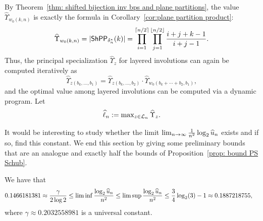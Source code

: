 \documentclass[10pt]{article}
\begin{document}
\begin{remark}
    By Theorem~\ref{thm: shifted bijection inv bps and plane partitions}, the value $\widehat{\Upsilon}_{w_0(k,n)}$ is exactly the formula in  Corollary~\ref{cor:plane partition product}:
\[
\widehat{\Upsilon}_{w_0(k,n)} = |\mathsf{ShPP}_{\delta^*_n}(k)| = \displaystyle\prod_{i=1}^{\lceil n/2\rceil} \prod_{j=1}^{\lfloor n/2\rfloor} \frac{i+j+k-1}{i+j-1}.
\]
Thus, the principal specialization $\widehat{\Upsilon}_z$ for layered involutions can again be computed iteratively as 
\begin{equation} \label{eq:prod layered invol}
\widehat{\Upsilon}_{z(b_k,\ldots,b_1)} = \widehat{\Upsilon}_{z(b_k,\ldots,b_{2})}\cdot \widehat{\Upsilon}_{w_0(b_k+\cdots+b_{2},b_1)},
\end{equation}
and the optimal value among layered involutions can be computed via a dynamic program. Let \[
\textstyle \widehat{\ell}_n:=\max_{z \in \mathcal{L}_n} \widehat{\Upsilon}_z.\] 
\end{remark} 


It would be interesting to study whether the limit $\lim_{n\to \infty} \frac{1}{n^2}\log_2 \widehat{u}_n$ 
exists and if so, find this constant. We end this section by giving some preliminary bounds that are an analogue and exactly half the bounds of Proposition~\ref{prop: bound PS Schub}.

\begin{proposition}
We have that 
\begin{align*}
0.1466181381 \approx \frac{\gamma}{2\log 2} \leq \lim \inf \frac{\log_2 \widehat{u}_n}{n^2} &\leq \lim \sup \frac{\log_2 \widehat{u}_n}{n^2} \leq \frac34 \log_2(3) -1  \approx 0.1887218755,
\end{align*}
where $\gamma\approx 0.2032558981$ is a universal constant.
\end{proposition}
\end{document}
